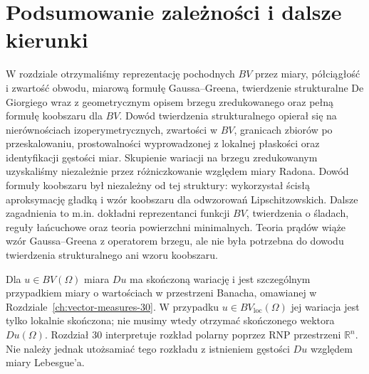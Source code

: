 \section{Podsumowanie zależności i dalsze kierunki}
W rozdziale otrzymaliśmy reprezentację pochodnych
$BV$ przez miary, półciągłość i zwartość obwodu,
miarową formułę Gaussa--Greena, twierdzenie strukturalne
De Giorgiego wraz z geometrycznym opisem brzegu
zredukowanego oraz pełną formułę koobszaru dla $BV$.
Dowód twierdzenia strukturalnego opierał się na
nierównościach izoperymetrycznych, zwartości w $BV$,
granicach zbiorów po przeskalowaniu, prostowalności
wyprowadzonej z lokalnej płaskości oraz
identyfikacji gęstości miar. Skupienie wariacji
na brzegu zredukowanym uzyskaliśmy niezależnie
przez różniczkowanie względem miary Radona.
Dowód formuły koobszaru był niezależny od
tej struktury: wykorzystał ścisłą aproksymację
gładką i wzór koobszaru dla odwzorowań Lipschitzowskich.
Dalsze zagadnienia to m.in. dokładni reprezentanci
funkcji $BV$, twierdzenia o śladach, reguły
łańcuchowe oraz teoria powierzchni minimalnych.
Teoria prądów wiąże wzór Gaussa--Greena z operatorem
brzegu, ale nie była potrzebna do dowodu twierdzenia
strukturalnego ani wzoru koobszaru.

\begin{uwaga}
Dla $u\in BV(\Omega)$ miara $Du$ ma skończoną wariację
i jest szczególnym przypadkiem miary o wartościach
w przestrzeni Banacha, omawianej w
Rozdziale~\ref{ch:vector-measures-30}.
W przypadku $u\in BV_{\mathrm{loc}}(\Omega)$ jej wariacja
jest tylko lokalnie skończona; nie musimy wtedy otrzymać
skończonego wektora $Du(\Omega)$.
Rozdział 30 interpretuje rozkład polarny poprzez RNP
przestrzeni $\mathbb R^n$. Nie należy jednak utożsamiać
tego rozkładu z istnieniem gęstości $Du$ względem
miary Lebesgue'a.
\end{uwaga}
